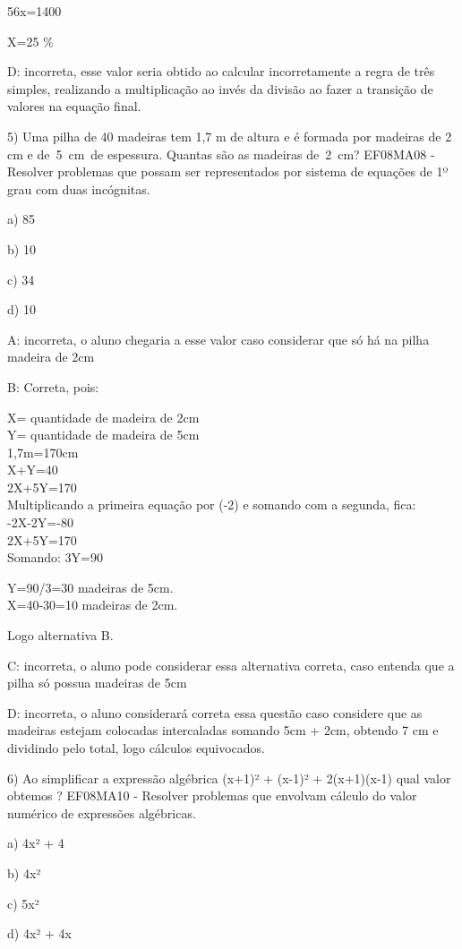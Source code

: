56x=1400

X=25 \%

D: incorreta, esse valor seria obtido ao calcular incorretamente a regra
de três simples, realizando a multiplicação ao invés da divisão ao fazer
a transição de valores na equação final.

5) Uma pilha de 40 madeiras tem 1,7 m de altura e é formada por madeiras
de 2 cm e de~5~cm~de espessura. Quantas são as madeiras de~2~cm?
EF08MA08 - Resolver problemas que possam ser representados por sistema
de equações de 1º grau com duas incógnitas.

a) 85

b) 10

c) 34

d) 10

A: incorreta, o aluno chegaria a esse valor caso considerar que só há na
pilha madeira de 2cm

B: Correta, pois:

X= quantidade de madeira de 2cm\\
Y= quantidade de madeira de 5cm\\
1,7m=170cm\\
X+Y=40\\
2X+5Y=170\\
Multiplicando a primeira equação por (-2) e somando com a segunda,
fica:\\
-2X-2Y=-80\\
2X+5Y=170\\
Somando: 3Y=90

Y=90/3=30 madeiras de 5cm.\\
X=40-30=10 madeiras de 2cm.

Logo alternativa B.

C: incorreta, o aluno pode considerar essa alternativa correta, caso
entenda que a pilha só possua madeiras de 5cm

D: incorreta, o aluno considerará correta essa questão caso considere
que as madeiras estejam colocadas intercaladas somando 5cm + 2cm,
obtendo 7 cm e dividindo pelo total, logo cálculos equivocados.

6) Ao simplificar a expressão algébrica (x+1)² + (x-1)² + 2(x+1)(x-1)
qual valor obtemos ? EF08MA10 - Resolver problemas que envolvam cálculo
do valor numérico de expressões algébricas.

a) 4x² + 4

b) 4x²

c) 5x²

d) 4x² + 4x


